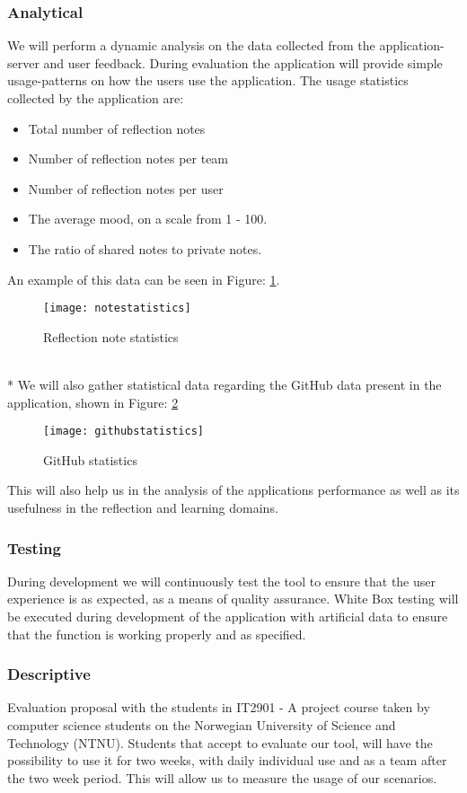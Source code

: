\subsubsection{Analytical}
We will perform a dynamic analysis on the data collected from the application-server and user feedback. During evaluation the application will provide simple usage-patterns on how the users use the application. The usage statistics collected by the application are: 
\begin{itemize}
\item Total number of reflection notes
\item Number of reflection notes per team
\item Number of reflection notes per user
\item The average mood, on a scale from 1 - 100.
\item The ratio of shared notes to private notes. 
\end{itemize}
An example of this data can be seen in Figure: \ref{notestatistics}. 
\begin{figure}[!htpb]
\centering
	\texttt{[image: notestatistics]}
\caption{Reflection note statistics}
\label{notestatistics}
\end{figure}
\\*
We will also gather statistical data regarding the GitHub data present in the application, shown in Figure: \ref{githubstatistics}
\begin{figure}[!htpb]
\centering
	\texttt{[image: githubstatistics]}
\caption{GitHub statistics}
\label{githubstatistics}
\end{figure}

This will also help us in the analysis of the applications performance as well as its usefulness in the reflection and learning domains.

\subsubsection{Testing}
During development we will continuously test the tool to ensure that the user experience is as expected, as a means of quality assurance.
White Box testing will be executed during development of the application with artificial data to ensure that the function is working properly and as specified. 

\subsubsection{Descriptive}
Evaluation proposal with the students in IT2901 - A project course taken by computer science students on the Norwegian University of Science and Technology (NTNU). 
Students that accept to evaluate our tool, will have the possibility to use it for two weeks, with daily individual use and as a team after the two week period. This will allow us to measure the usage of our scenarios. 

